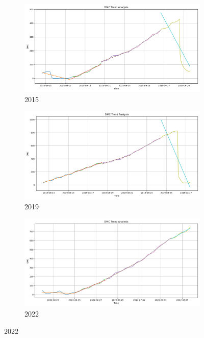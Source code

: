 \begin{figure}[h]
	\centering
	\caption{15-days DMC polyfit trend}
	\begin{subfigure}{0.3\textwidth}
		\centering
		\includegraphics[width=\textwidth]{graphs/polyfit_trend_analysis/2015_15days_BLOCK3days_dmc_trend_analysis.png}
		\caption{2015}
		\label{fig:2015_polyfit_DMC}
	\end{subfigure}
	\hfill
	\begin{subfigure}{0.3\textwidth}
		\centering
		\includegraphics[width=\textwidth]{graphs/polyfit_trend_analysis/2019_15days_BLOCK3days_dmc_trend_analysis.png}
		\caption{2019}
		\label{fig:2019_polyfit_DMC}
	\end{subfigure}
	\hfill
	\begin{subfigure}{0.3\textwidth}
		\centering
		\includegraphics[width=\textwidth]{graphs/polyfit_trend_analysis/2022_15days_BLOCK3days_dmc_trend_analysis.png}
		\caption{2022}
		\label{fig:2022_polyfit_DMC}
	\end{subfigure}
	
	\label{fig:DMC_polyfit_15}
\end{figure}


